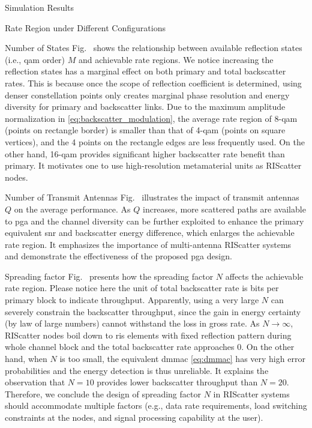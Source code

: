 \documentclass[journal]{IEEEtran}
\begin{document}
\begin{section}{Simulation Results}
\begin{subsection}{Rate Region under Different Configurations}
		\begin{subsubsection}{Number of States}
			Fig.~ shows the relationship between available reflection states (i.e., \gls{qam} order) $M$ and achievable rate regions.
			We notice increasing the reflection states has a marginal effect on both primary and total backscatter rates.
			This is because once the scope of reflection coefficient is determined, using denser constellation points only creates marginal phase resolution and energy diversity for primary and backscatter links.
			Due to the maximum amplitude normalization in \eqref{eq:backscatter_modulation}, the average rate region of \num{8}-\gls{qam} (points on rectangle border) is smaller than that of \num{4}-\gls{qam} (points on square vertices), and the \num{4} points on the rectangle edges are less frequently used.
			On the other hand, \num{16}-\gls{qam} provides significant higher backscatter rate benefit than primary.
			It motivates one to use high-resolution metamaterial units as RIScatter nodes.
		\end{subsubsection}

		\begin{subsubsection}{Number of Transmit Antennas}
			Fig.~ illustrates the impact of transmit antennas $Q$ on the average performance.
			As $Q$ increases, more scattered paths are available to \gls{pga} and the channel diversity can be further exploited to enhance the primary equivalent \gls{snr} and backscatter energy difference, which enlarges the achievable rate region.
			It emphasizes the importance of multi-antenna RIScatter systems and demonstrate the effectiveness of the proposed \gls{pga} design.
		\end{subsubsection}

		\begin{subsubsection}{Spreading factor}
			Fig.~ presents how the spreading factor $N$ affects the achievable rate region.
			Please notice here the unit of total backscatter rate is bits per primary block to indicate throughput.
			Apparently, using a very large $N$ can severely constrain the backscatter throughput, since the gain in energy certainty (by law of large numbers) cannot withstand the loss in gross rate.
			As $N \to \infty$, RIScatter nodes boil down to \gls{ris} elements with fixed reflection pattern during whole channel block and the total backscatter rate approaches \num{0}.
			On the other hand, when $N$ is too small, the equivalent \gls{dmmac} \eqref{eq:dmmac} has very high error probabilities and the energy detection is thus unreliable.
			It explains the observation that $N=10$ provides lower backscatter throughput than $N=20$.
			Therefore, we conclude the design of spreading factor $N$ in RIScatter systems should accommodate multiple factors (e.g., data rate requirements, load switching constraints at the nodes, and signal processing capability at the user).
		\end{subsubsection}


\end{subsection}
\end{section}
\end{document}
